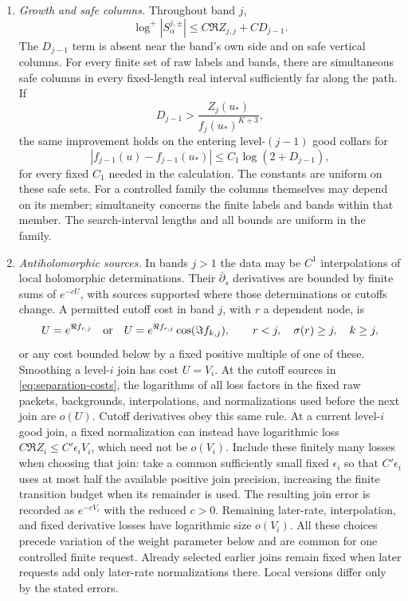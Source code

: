 \begin{definition}
\begin{enumerate}
\item \emph{Growth and safe columns.}
Throughout band $j$,
\begin{equation}\label{eq:separation-raw-growth}
 \log^+|S^{j,\pm}_{\alpha}|
       \leq C\Re Z_{j,j}+CD_{j-1}.
\end{equation}
The $D_{j-1}$ term is absent near the band's own side and on safe
vertical columns.  For every finite set of raw labels and bands,
there are simultaneous safe columns in every fixed-length real
interval sufficiently far along the path.  If
\[
 D_{j-1}>\frac{Z_j(u_*)}{f_j(u_*)^{K+3}},
\]
the same improvement holds on the entering level-$(j-1)$ good
collars for
\[
 |f_{j-1}(u)-f_{j-1}(u_*)|
       \leq C_1\log(2+D_{j-1}),
\]
for every fixed $C_1$ needed in the calculation.  The constants
are uniform on these safe sets.  For a controlled family the
columns themselves may depend on its member; simultaneity
concerns the finite labels and bands within that member.  The
search-interval lengths and all bounds are uniform in the family.

\item \emph{Antiholomorphic sources.}
In bands $j>1$ the data may be $C^1$ interpolations of local
holomorphic determinations.  Their $\bar\partial_s$ derivatives
are bounded by finite sums of $e^{-cU}$, with sources supported
where those determinations or cutoffs change.  A permitted cutoff
cost in band $j$, with $r$ a dependent node, is
\begin{equation}\label{eq:separation-costs}
 U=e^{\Re f_{r,j}}\quad\hbox{or}\quad
 U=e^{\Re f_{r,j}}\cos(\Im f_{k,j}),
 \qquad r<j,\quad\sigma(r)\geq j,\quad k\geq j,
\end{equation}
or any cost bounded below by a fixed positive multiple of one of
these.  Smoothing a level-$i$ join has cost $U=V_i$.
At the cutoff sources in \eqref{eq:separation-costs}, the
logarithms of all loss factors in the fixed
raw packets, backgrounds, interpolations, and normalizations used
before the next join are $o(U)$.  Cutoff derivatives obey this
same rule.  At a current level-$i$ good join, a fixed
normalization can instead have logarithmic loss
$C\Re Z_i\leq C'\epsilon_iV_i$, which need not be $o(V_i)$.
Include these finitely many losses when choosing that join:
take a common sufficiently small fixed $\epsilon_i$ so that
$C'\epsilon_i$ uses at most half the available positive join
precision, increasing the finite transition budget when its
remainder is used.  The resulting join error is recorded as
$e^{-cV_i}$ with the reduced $c>0$.  Remaining later-rate,
interpolation, and fixed derivative losses have logarithmic
size $o(V_i)$.  All these choices precede variation of the
weight parameter below and are common for one controlled finite
request.  Already selected earlier joins remain fixed when
later requests add only later-rate normalizations there.
Local versions differ only by the stated errors.
\end{enumerate}
\end{definition}

